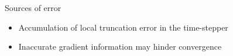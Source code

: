 \documentclass[10pt]{article}
\begin{document}
Sources of error
\begin{itemize}
\item Accumulation of local truncation error in the time-stepper
\item Inaccurate gradient information may hinder convergence


\end{itemize}



%
%
\end{document}
